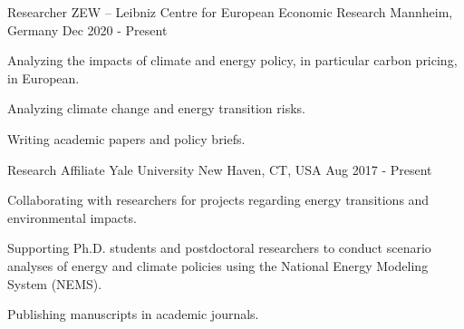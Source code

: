 

\begin{cventries}

    \cventry
    {Researcher} %
    {ZEW -- Leibniz Centre for European Economic Research} %
    {Mannheim, Germany} %
    {Dec 2020 - Present} %
    {
        \begin{cvitems} %
            \item {Analyzing the impacts of climate and energy policy, in particular carbon pricing, in European.}
            \item {Analyzing climate change and energy transition risks.}
            \item {Writing academic papers and policy briefs.}
        \end{cvitems}
    }

    \cventry
    {Research Affiliate} %
    {Yale University} %
    {New Haven, CT, USA} %
    {Aug 2017 - Present} %
    {
        \begin{cvitems} %
            \item {Collaborating with researchers for projects regarding energy transitions and environmental impacts.}
            \item {Supporting Ph.D. students and postdoctoral researchers to conduct scenario analyses of energy and climate policies using the National Energy Modeling System (NEMS).}
            \item {Publishing manuscripts in academic journals.}
        \end{cvitems}
    }


\end{cventries}
